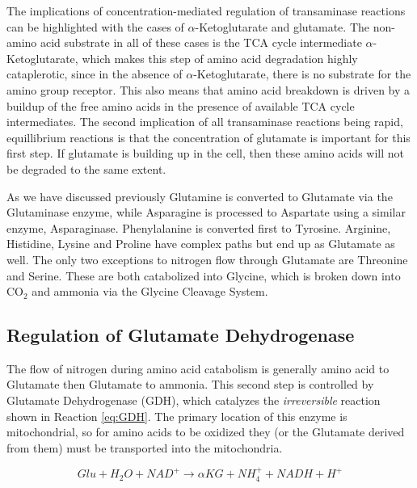 \documentclass{tufte-handout}
\begin{document}
The implications of concentration-mediated regulation of transaminase reactions can be highlighted with the cases of $\alpha$-Ketoglutarate and glutamate.  The non-amino acid substrate in all of these cases is the TCA cycle intermediate $\alpha$-Ketoglutarate, which makes this step of amino acid degradation highly cataplerotic, since in the absence of $\alpha$-Ketoglutarate, there is no substrate for the amino group receptor.  This also means that amino acid breakdown is driven by a buildup of the free amino acids in the presence of available TCA cycle intermediates.  The second implication of all transaminase reactions being rapid, equillibrium reactions is that the concentration of glutamate is important for this first step.  If glutamate is building up in the cell, then these amino acids will not be degraded to the same extent.

  As we have discussed previously Glutamine is converted to Glutamate via the Glutaminase enzyme, while Asparagine is processed to Aspartate using a similar enzyme, Asparaginase.  Phenylalanine is converted first to Tyrosine.  Arginine, Histidine, Lysine and Proline have complex paths but end up as Glutamate as well.  The only two exceptions to nitrogen flow through Glutamate are Threonine and Serine.  These are both catabolized into Glycine, which is broken down into CO$_2$ and ammonia via the Glycine Cleavage System.

\subsection{Regulation of Glutamate Dehydrogenase}

The flow of nitrogen during amino acid catabolism is generally amino acid to Glutamate then Glutamate to ammonia.  This second step is controlled by Glutamate Dehydrogenase (GDH), which catalyzes the \emph{irreversible} reaction shown in Reaction \ref{eq:GDH}.  The primary location of this enzyme is mitochondrial, so for amino acids to be oxidized they (or the Glutamate derived from them) must be transported into the mitochondria.

\begin{equation}\label{eq:GDH}
Glu + H_2O + NAD^+  \rightarrow  \alpha KG + NH_4^+ + NADH + H^+
\end{equation}
\end{document}

